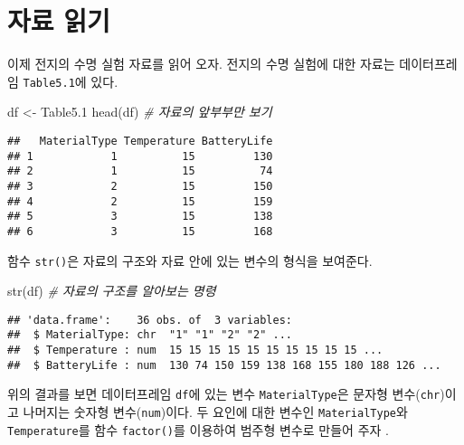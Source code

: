 \documentclass[
]{book}
\newenvironment{Shaded}{\begin{snugshade}}{\end{snugshade}}
\newcommand{\CommentTok}[1]{\textcolor[rgb]{0.56,0.35,0.01}{\textit{#1}}}
\newcommand{\FloatTok}[1]{\textcolor[rgb]{0.00,0.00,0.81}{#1}}
\newcommand{\FunctionTok}[1]{\textcolor[rgb]{0.00,0.00,0.00}{#1}}
\newcommand{\NormalTok}[1]{#1}
\newcommand{\OtherTok}[1]{\textcolor[rgb]{0.56,0.35,0.01}{#1}}
\newcommand{\SpecialCharTok}[1]{\textcolor[rgb]{0.00,0.00,0.00}{#1}}
\begin{document}
\hypertarget{uxc790uxb8cc-uxc77duxae30}{%
\section{자료 읽기}\label{uxc790uxb8cc-uxc77duxae30}}

이제 전지의 수명 실험 자료를 읽어 오자. 전지의 수명 실험에 대한 자료는 데이터프레임 \texttt{Table5.1}에 있다.

\begin{Shaded}
\begin{Highlighting}[]
\NormalTok{df }\OtherTok{\textless{}{-}}\NormalTok{ Table5}\FloatTok{.1}
\FunctionTok{head}\NormalTok{(df) }\CommentTok{\# 자료의 앞부부만 보기   }
\end{Highlighting}
\end{Shaded}

\begin{verbatim}
##   MaterialType Temperature BatteryLife
## 1            1          15         130
## 2            1          15          74
## 3            2          15         150
## 4            2          15         159
## 5            3          15         138
## 6            3          15         168
\end{verbatim}

함수 \texttt{str()}은 자료의 구조와 자료 안에 있는 변수의 형식을 보여준다.

\begin{Shaded}
\begin{Highlighting}[]
\FunctionTok{str}\NormalTok{(df)  }\CommentTok{\# 자료의 구조를 알아보는 명령}
\end{Highlighting}
\end{Shaded}

\begin{verbatim}
## 'data.frame':    36 obs. of  3 variables:
##  $ MaterialType: chr  "1" "1" "2" "2" ...
##  $ Temperature : num  15 15 15 15 15 15 15 15 15 15 ...
##  $ BatteryLife : num  130 74 150 159 138 168 155 180 188 126 ...
\end{verbatim}

위의 결과를 보면 데이터프레임 \texttt{df}에 있는 변수 \texttt{MaterialType}은 문자형 변수(\texttt{chr})이고 나머지는 숫자형 변수(\texttt{num})이다. 두 요인에 대한 변수인 \texttt{MaterialType}와 \texttt{Temperature}를 함수 \texttt{factor()}를 이용하여 범주형 변수로 만들어 주자 .

\begin{Shaded}
\end{Shaded}
\end{document}
